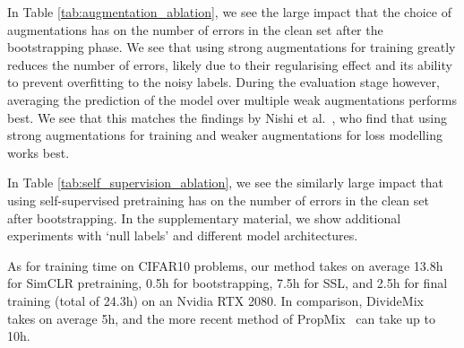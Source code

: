 \documentclass[10pt,twocolumn,letterpaper]{article}
\begin{document}
In Table \ref{tab:augmentation_ablation}, we see the large impact that the choice of augmentations has on the number of errors in the clean set after the bootstrapping phase. We see that using strong augmentations for training greatly reduces the number of errors, likely due to their regularising effect and its ability to prevent overfitting to the noisy labels. During the evaluation stage however, averaging the prediction of the model over multiple weak augmentations performs best. We see that this matches the findings by Nishi et al.~\cite{Nishi_2021_CVPR}, who find that using strong augmentations for training and weaker augmentations for loss modelling works best.

In Table \ref{tab:self_supervision_ablation}, we see the similarly large impact that using self-supervised pretraining has on the number of errors in the clean set after bootstrapping. In the supplementary material, we show additional experiments with `null labels' and different model architectures.

As for training time on CIFAR10 problems, our method takes on average 13.8h for SimCLR pretraining, 0.5h for bootstrapping, 7.5h for SSL, and 2.5h for final training (total of 24.3h) on an Nvidia RTX 2080. In comparison, DivideMix~\cite{li2020dividemix} takes on average 5h, and the more recent method of PropMix~\cite{cordeiro2021propmix} can take up to 10h.

\begin{table}[t!]
    \begin{center}
    \end{center}
    \caption{Model accuracy after each stage of training on CIFAR10 Asym. 40\% noise.}
    \label{tab:stage_accuracy}
\end{table}
\end{document}
